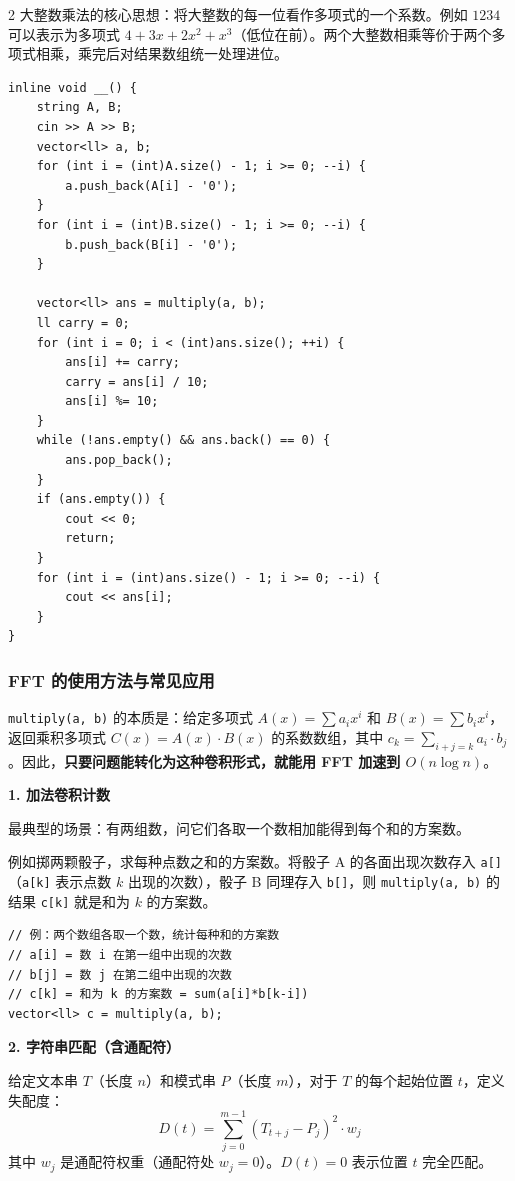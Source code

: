 \begin{multicols*}{2}
		大整数乘法的核心思想：将大整数的每一位看作多项式的一个系数。例如 $1234$ 可以表示为多项式 $4 + 3x + 2x^2 + x^3$（低位在前）。两个大整数相乘等价于两个多项式相乘，乘完后对结果数组统一处理进位。

		\begin{verbatim}
inline void __() {
	string A, B;
	cin >> A >> B;
	vector<ll> a, b;
	for (int i = (int)A.size() - 1; i >= 0; --i) {
		a.push_back(A[i] - '0');
	}
	for (int i = (int)B.size() - 1; i >= 0; --i) {
		b.push_back(B[i] - '0');
	}
	
	vector<ll> ans = multiply(a, b);
	ll carry = 0;
	for (int i = 0; i < (int)ans.size(); ++i) {
		ans[i] += carry;
		carry = ans[i] / 10;
		ans[i] %= 10;
	}
	while (!ans.empty() && ans.back() == 0) {
		ans.pop_back();
	}
	if (ans.empty()) {
		cout << 0;
		return;
	}
	for (int i = (int)ans.size() - 1; i >= 0; --i) {
		cout << ans[i];
	}
}
		\end{verbatim}

		\subsubsection{FFT 的使用方法与常见应用}

		\texttt{multiply(a, b)} 的本质是：给定多项式 $A(x) = \sum a_i x^i$ 和 $B(x) = \sum b_i x^i$，返回乘积多项式 $C(x) = A(x) \cdot B(x)$ 的系数数组，其中 $c_k = \sum_{i+j=k} a_i \cdot b_j$。因此，\textbf{只要问题能转化为这种卷积形式，就能用 FFT 加速到 $O(n \log n)$}。

		\textbf{1. 加法卷积计数}

		最典型的场景：有两组数，问它们各取一个数相加能得到每个和的方案数。

		例如掷两颗骰子，求每种点数之和的方案数。将骰子 A 的各面出现次数存入 \texttt{a[]}（\texttt{a[k]} 表示点数 $k$ 出现的次数），骰子 B 同理存入 \texttt{b[]}，则 \texttt{multiply(a, b)} 的结果 \texttt{c[k]} 就是和为 $k$ 的方案数。

		\begin{verbatim}
// 例：两个数组各取一个数，统计每种和的方案数
// a[i] = 数 i 在第一组中出现的次数
// b[j] = 数 j 在第二组中出现的次数
// c[k] = 和为 k 的方案数 = sum(a[i]*b[k-i])
vector<ll> c = multiply(a, b);
		\end{verbatim}

		\textbf{2. 字符串匹配（含通配符）}

		给定文本串 $T$（长度 $n$）和模式串 $P$（长度 $m$），对于 $T$ 的每个起始位置 $t$，定义失配度：
		$$D(t) = \sum_{j=0}^{m-1} (T_{t+j} - P_j)^2 \cdot w_j$$
		其中 $w_j$ 是通配符权重（通配符处 $w_j = 0$）。$D(t) = 0$ 表示位置 $t$ 完全匹配。


\end{multicols*}
